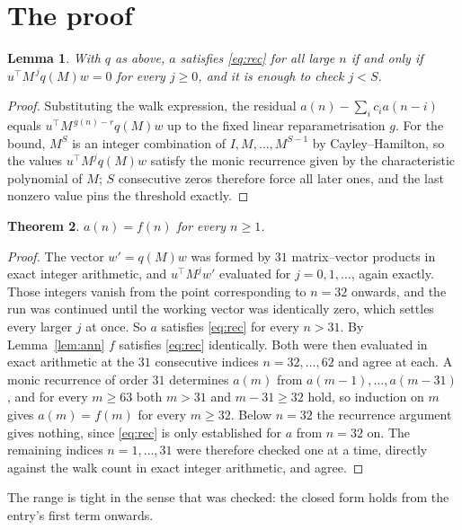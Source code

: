 \documentclass[11pt,a4paper]{article}
\theoremstyle{plain}
\newtheorem{theorem}{Theorem}
\newtheorem{lemma}[theorem]{Lemma}
\theoremstyle{definition}
\begin{document}
\section{The proof}

\begin{lemma}\label{lem:crit}
With $q$ as above, $a$ satisfies \eqref{eq:rec} for all large $n$ if and only if
$u^{\!\top}M^{\,j}q(M)w=0$ for every $j\ge0$, and it is enough to check $j<S$.
\end{lemma}

\begin{proof}
Substituting the walk expression, the residual $a(n)-\sum_ic_ia(n-i)$ equals
$u^{\!\top}M^{\,g(n)-r}q(M)w$ up to the fixed linear reparametrisation $g$. For the bound,
$M^{S}$ is an integer combination of $I,M,\dots,M^{S-1}$ by Cayley--Hamilton, so the values
$u^{\!\top}M^{j}q(M)w$ satisfy the monic recurrence given by the characteristic polynomial of
$M$; $S$ consecutive zeros therefore force all later ones, and the last nonzero value pins the
threshold exactly.
\end{proof}

\begin{theorem}
$a(n)=f(n)$ for every $n\ge1$.
\end{theorem}

\begin{proof}
The vector $w'=q(M)w$ was formed by $31$ matrix--vector products in exact integer
arithmetic, and $u^{\!\top}M^{j}w'$ evaluated for $j=0,1,\dots$, again exactly. Those integers
vanish from the point corresponding to $n=32$ onwards, and the run was continued until the
working vector was identically zero, which settles every larger $j$ at once. So $a$ satisfies
\eqref{eq:rec} for every $n>31$. By Lemma~\ref{lem:ann} $f$ satisfies \eqref{eq:rec}
identically. Both were then evaluated in exact arithmetic at the $31$ consecutive indices
$n=32,\dots,62$ and agree at each. A monic recurrence of order $31$
determines $a(m)$ from $a(m-1),\dots,a(m-31)$, and for every $m\ge63$ both
$m>31$ and $m-31\ge32$ hold, so induction on $m$ gives $a(m)=f(m)$ for every
$m\ge32$.
Below $n=32$ the recurrence argument gives nothing, since \eqref{eq:rec} is only
established for $a$ from $n=32$ on. The remaining indices $n=1,\dots,31$ were
therefore checked one at a time, directly against the walk count in exact integer arithmetic,
and agree.
\end{proof}

The range is tight in the sense that was checked: the closed form holds from the entry's first term onwards.
\end{document}
